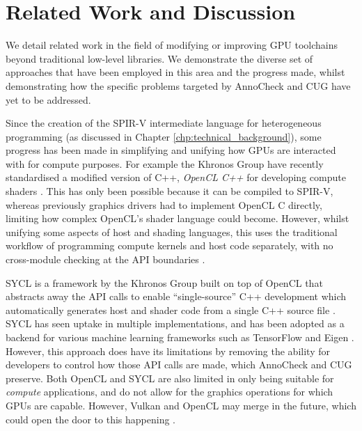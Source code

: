 \documentclass[a4paper,12pt,twoside,openright]{report}
\begin{document}



\chapter{Related Work and Discussion}



\label{chp:related_work}

We detail related work in the field of modifying or improving GPU toolchains
beyond traditional low-level libraries. We demonstrate the diverse set of
approaches that have been employed in this area and the progress made, whilst
demonstrating how the specific problems targeted by AnnoCheck and CUG have yet
to be addressed.

Since the creation of the SPIR-V intermediate language for heterogeneous
programming (as discussed in Chapter \ref{chp:technical_background}), some
progress has been made in simplifying and unifying how GPUs are interacted with
for compute purposes. For example the Khronos Group have recently standardised
a modified version of C++, \textit{OpenCL C++} for developing compute shaders
\cite{OpenCL22Release} \cite{OpenCLCPPWhitePaper} \cite{OpenCL}. This has only
been possible because it can be compiled to SPIR-V, whereas previously graphics
drivers had to implement OpenCL C directly, limiting how complex OpenCL's
shader language could become. However, whilst unifying some aspects of host and
shading languages, this uses the traditional workflow of programming compute
kernels and host code separately, with no cross-module checking at the API
boundaries \cite{OpenCL22Release}.

SYCL is a framework by the Khronos Group built on top of OpenCL that abstracts
away the API calls to enable ``single-source'' C++ development which
automatically generates host and shader code from a single C++ source file
\cite{OpenCL22Release} \cite{SYCL}. SYCL has seen uptake in multiple
implementations, and has been adopted as a backend for various machine learning
frameworks such as TensorFlow and Eigen \cite{ComputeCPP} \cite{triSYCL}
\cite{SYCLTensorFlow} \cite{SYCLEigen}. However, this approach does have its
limitations by removing the ability for developers to control how those API
calls are made, which AnnoCheck and CUG preserve. Both OpenCL and SYCL are also
limited in only being suitable for \textit{compute} applications, and do not
allow for the graphics operations for which GPUs are capable. However, Vulkan
and OpenCL may merge in the future, which could open the door to this happening
\cite{VulkanOpenCLMerge}.
\end{document}
